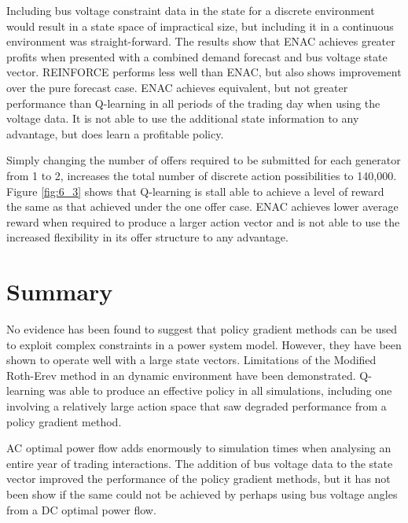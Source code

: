 Including bus voltage constraint data in the state for a discrete environment
would result in a state space of impractical size, but including it in a
continuous environment was straight-forward.  The results show that ENAC
achieves greater profits when presented with a combined demand forecast and bus
voltage state vector.  REINFORCE performs less well than ENAC, but also shows
improvement over the pure forecast case.  ENAC achieves equivalent, but not
greater performance than Q-learning in all periods of the trading day when
using the voltage data.  It is not able to use the additional state information
to any advantage, but does learn a profitable policy.

Simply changing the number of offers required to be submitted for each generator
from 1 to 2, increases the total number of discrete action possibilities to
140,000.  Figure \ref{fig:6_3} shows that Q-learning is stall able to achieve a
level of reward the same as that achieved under the one offer case.  ENAC
achieves lower average reward when required to produce a larger action vector
and is not able to use the increased flexibility in its offer structure to any
advantage.

\section{Summary}
No evidence has been found to suggest that policy gradient methods can be used
to exploit complex constraints in a power system model.  However, they have been
shown to operate well with a large state vectors.  Limitations of the Modified
Roth-Erev method in an dynamic environment have been demonstrated.  Q-learning
was able to produce an effective policy in all simulations, including one
involving a relatively large action space that saw degraded performance from a
policy gradient method.

AC optimal power flow adds enormously to simulation times when analysing an
entire year of trading interactions.  The addition of bus voltage data to the
state vector improved the performance of the policy gradient methods, but it has
not been show if the same could not be achieved by perhaps using bus voltage
angles from a DC optimal power flow.
